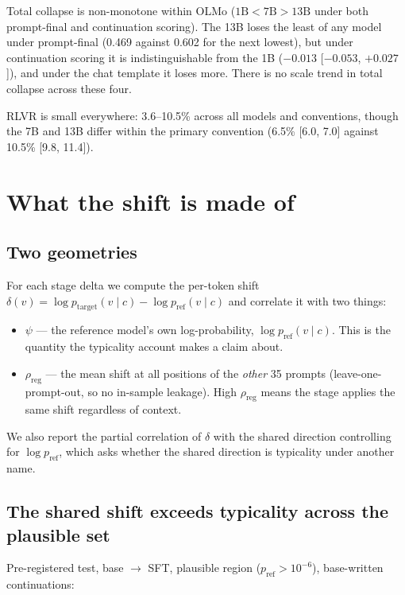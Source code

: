 \documentclass[11pt]{article}
\newcommand{\rreg}{\rho_{\mathrm{reg}}}
\begin{document}
Total collapse is non-monotone within OLMo ($1\mathrm{B} < 7\mathrm{B} >
13\mathrm{B}$ under both prompt-final and continuation scoring). The 13B loses the
least of any model under prompt-final (0.469 against 0.602 for the next lowest),
but under continuation scoring it is indistinguishable from the 1B ($-0.013$
[$-0.053$, $+0.027$]), and under the chat template it loses more. There is no scale
trend in total collapse across these four.

RLVR is small everywhere: 3.6--10.5\% across all models and conventions, though the
7B and 13B differ within the primary convention (6.5\% [6.0, 7.0] against 10.5\%
[9.8, 11.4]).

\section{What the shift is made of}
\label{sec:geom}

\subsection{Two geometries}

For each stage delta we compute the per-token shift
$\delta(v) = \log p_{\mathrm{target}}(v \mid c) - \log p_{\mathrm{ref}}(v \mid c)$
and correlate it with two things:

\begin{itemize}
\item $\psi$ --- the reference model's own log-probability,
$\log p_{\mathrm{ref}}(v \mid c)$. This is the quantity the typicality account
makes a claim about.
\item $\rreg$ --- the mean shift at all positions of the \emph{other} 35 prompts
(leave-one-prompt-out, so no in-sample leakage). High $\rreg$ means the stage
applies the same shift regardless of context.
\end{itemize}

We also report the partial correlation of $\delta$ with the shared direction
controlling for $\log p_{\mathrm{ref}}$, which asks whether the shared direction is
typicality under another name.

\subsection{The shared shift exceeds typicality across the plausible set}
\label{sec:exceeds}

Pre-registered test, base $\to$ SFT, plausible region
($p_{\mathrm{ref}} > 10^{-6}$), base-written continuations:
\end{document}
